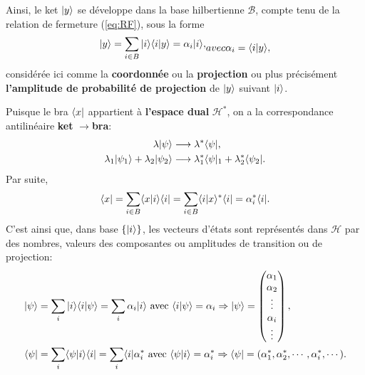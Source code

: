 Ainsi, le ket $\vert y\rangle $ se développe dans la base hilbertienne $\mathcal{B}$,
compte tenu de la relation de fermeture (\ref{eq:RF}), sous la forme%
\begin{subequations}
\begin{align}
\ket{y} =\sum_{i\in B}\ket{i} \langle i\ket{y} =\alpha_{i}\ket{i},
\end{align}
\label{eq:XY}%
avec%
\begin{align}
\alpha_{i}=\langle i\ket{y},
\end{align}
\end{subequations}
considérée ici comme la \textbf{coordonnée} ou la \textbf{projection} ou plus
précisément \textbf{l'amplitude de probabilité de projection} de $\vert y\rangle$
suivant $\vert i\rangle$.

Puisque le bra $\langle x\vert$ appartient à \textbf{l'espace dual}
$\mathcal{H}^{\ast}$, on a la correspondance antilinéaire \textbf{ket}
$\rightarrow$\textbf{bra}:
\begin{subequations}%
\begin{align}
\lambda\vert\psi\rangle  &  \longrightarrow\lambda^{\ast}\langle\psi\vert,\\
\lambda_1\vert\psi_1\rangle+\lambda_2\vert\psi_2\rangle&
\longrightarrow\lambda_1^{\ast}\langle\psi\vert_1+\lambda_2^{\ast}
\langle\psi_2\vert.
\end{align}%
\end{subequations}%
Par suite,
\begin{equation}
\langle x\vert =\sum_{i\in B}\langle x\vert i\rangle\langle i\vert =\sum_{i\in B}\langle i\vert x\rangle
^{\ast}\langle i\vert =\alpha_{i}^{\ast}\langle i\vert.
\end{equation}
C'est ainsi que, dans base $\{\vert i\rangle\}$, les vecteurs d'états sont représentés
dans $\mathcal{H}$ par des nombres, valeurs des composantes ou amplitudes de
transition ou de projection:
\begin{subequations}%
\begin{align}
\vert\psi\rangle &  =\sum_{i}\vert i\rangle\langle i\vert\psi\rangle=\sum_{i}\alpha_{i}\vert i\rangle
\text{ avec }\langle i\vert\psi\rangle =\alpha_{i}\Rightarrow\vert\psi\rangle =
\begin{pmatrix}
\alpha_1\\
\alpha_2\\
\vdots\\
\alpha_{i}\\
\vdots
\end{pmatrix},\\
\langle\psi\vert &  =\sum_{i}\langle\psi\vert i\rangle\langle i\vert=\sum_{i}\langle i\vert
\alpha_{i}^{\ast}\text{ avec }\langle\psi\vert i\rangle=\alpha_{i}^{\ast}
\Rightarrow\langle\psi\vert=(\alpha_1^{\ast},\alpha_2^{\ast},\cdots,\alpha_{i}^{
\ast},\cdots).
\end{align}%
\end{subequations}%

